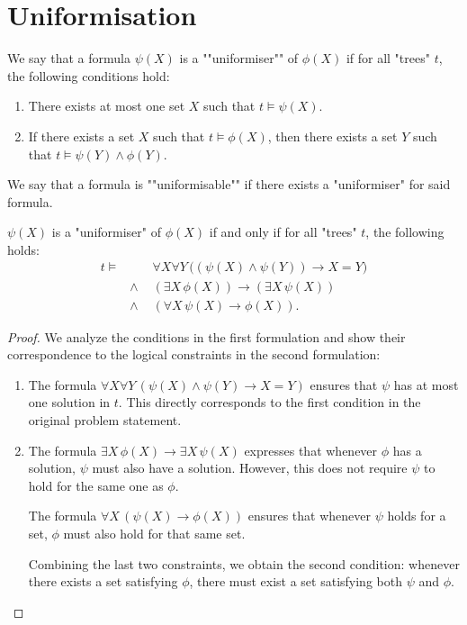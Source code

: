 \documentclass[twoside]{article}
\begin{document}
\section{Uniformisation}\label{sec:uniformisation}

\begin{definition}[Uniformiser]\label{def:uniformiser}
	We say that a formula $\psi(X)$ is a ""uniformiser"" of $\phi(X)$ if for all "trees" $t$, the following conditions hold:
	\begin{enumerate}
		\item There exists at most one set $X$ such that $t \models \psi(X)$.
		\item If there exists a set $X$ such that $t \models \phi(X)$, then there exists a set $Y$ such that $t \models \psi(Y) \land \phi(Y)$.
	\end{enumerate}

	We say that a formula is ""uniformisable"" if there exists a "uniformiser" for said formula.
\end{definition}

\begin{lemma}
	$\psi(X)$ is a "uniformiser" of $\phi(X)$ if and only if for all "trees" $t$, the following holds:
	\begin{eqnarray*}
		t \models &\quad &  \forall X \forall Y \, \Big((\psi(X) \land \psi(Y)) \rightarrow X = Y\Big) \\
		& \land & (\exists X \, \phi(X)) \rightarrow (\exists X \, \psi(X)) \\
		& \land& (\forall X \, \psi(X) \rightarrow \phi(X)).
	\end{eqnarray*}
\end{lemma}

\begin{proof}
	We analyze the conditions in the first formulation and show their correspondence to the logical constraints in the second formulation:

	\begin{enumerate}
		\item The formula $\forall X \forall Y \, (\psi(X) \land \psi(Y) \rightarrow X = Y)$ ensures that $\psi$ has at most one solution
		      in $t$. This directly corresponds to the first condition in the original problem statement.

		\item The formula $\exists X \, \phi(X) \rightarrow \exists X \, \psi(X)$ expresses that whenever $\phi$ has a solution, $\psi$ must also have a solution.
		      However, this does not require $\psi$ to hold for the same one as $\phi$.

		      The formula $\forall X \, (\psi(X) \rightarrow \phi(X))$ ensures that whenever $\psi$ holds for a set, $\phi$ must also hold for that same set.

		      Combining the last two constraints, we obtain the second condition: whenever there exists a set satisfying $\phi$, there must exist a set
		      satisfying both $\psi$ and $\phi$.
	\end{enumerate}
\end{proof}
\end{document}
